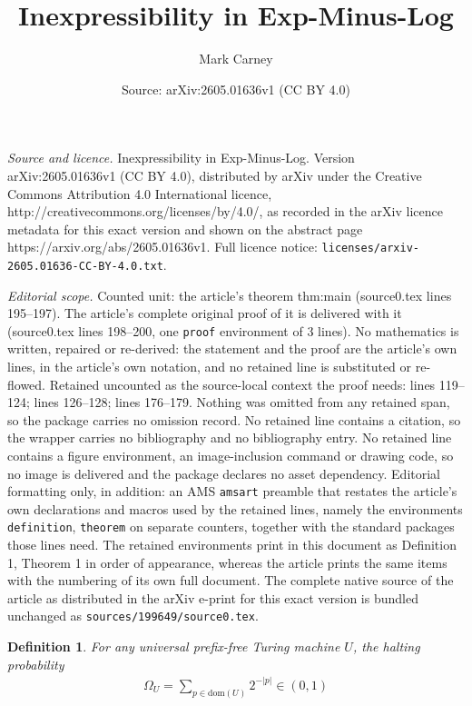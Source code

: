\documentclass[10pt,a4paper]{amsart}
\title{Inexpressibility in Exp-Minus-Log}
\author{Mark Carney}
\date{Source: arXiv:2605.01636v1 (CC BY 4.0)}
\newtheorem{definition}{Definition}
\begin{document}
\maketitle

\noindent\emph{Source and licence.} Inexpressibility in Exp-Minus-Log. Version arXiv:2605.01636v1 (CC BY 4.0), distributed by arXiv under the Creative Commons Attribution 4.0 International licence, http://creativecommons.org/licenses/by/4.0/, as recorded in the arXiv licence metadata for this exact version and shown on the abstract page https://arxiv.org/abs/2605.01636v1. Full licence notice: \texttt{licenses/arxiv-2605.01636-CC-BY-4.0.txt}.\par\smallskip

\noindent\textit{Editorial scope.} Counted unit: the article's theorem thm:main (source0.tex lines 195--197). The article's complete original proof of it is delivered with it (source0.tex lines 198--200, one \texttt{proof} environment of 3 lines). No mathematics is written, repaired or re-derived: the statement and the proof are the article's own lines, in the article's own notation, and no retained line is substituted or re-flowed.  Retained uncounted as the source-local context the proof needs: lines 119--124; lines 126--128; lines 176--179.  Nothing was omitted from any retained span, so the package carries no omission record.  No retained line contains a citation, so the wrapper carries no bibliography and no bibliography entry.  No retained line contains a figure environment, an image-inclusion command or drawing code, so no image is delivered and the package declares no asset dependency.  Editorial formatting only, in addition: an AMS \texttt{amsart} preamble that restates the article's own declarations and macros used by the retained lines, namely the environments \texttt{definition}, \texttt{theorem} on separate counters, together with the standard packages those lines need.  The retained environments print in this document as Definition 1, Theorem 1 in order of appearance, whereas the article prints the same items with the numbering of its own full document.  The complete native source of the article as distributed in the arXiv e-print for this exact version is bundled unchanged as \texttt{sources/199649/source0.tex}.
\begin{definition}\label{def:omega}
    For any universal prefix-free Turing machine $U$, the halting probability
\begin{align}
    \Omega_U = \sum_{p\in \text{dom}(U)} 2^{-|p|} \in (0,1)
\end{align}
\end{definition}
\end{document}

